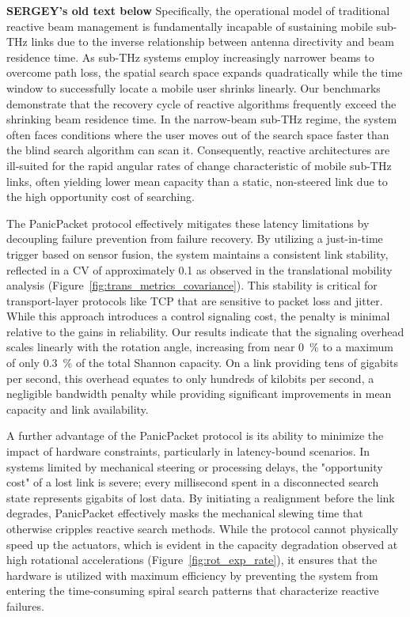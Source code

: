 \documentclass[fleqn,10pt]{wlscirep}
\begin{document}

\textbf{{SERGEY's old text below}}
Specifically, the operational model of traditional reactive beam management is fundamentally incapable of sustaining mobile sub-THz links due to the inverse relationship between antenna directivity and beam residence time. As sub-THz systems employ increasingly narrower beams to overcome path loss, the spatial search space expands quadratically while the time window to successfully locate a mobile user shrinks linearly. Our benchmarks demonstrate that the recovery cycle of reactive algorithms frequently exceed the shrinking beam residence time. In the narrow-beam sub-THz regime, the system often faces conditions where the user moves out of the search space faster than the blind search algorithm can scan it. Consequently, reactive architectures are ill-suited for the rapid angular rates of change characteristic of mobile sub-THz links, often yielding lower mean capacity than a static, non-steered link due to the high opportunity cost of searching.

The PanicPacket protocol effectively mitigates these latency limitations by decoupling failure prevention from failure recovery. By utilizing a just-in-time trigger based on sensor fusion, the system maintains a consistent link stability, reflected in a CV of approximately 0.1 as observed in the translational mobility analysis (Figure~\ref{fig:trans_metrics_covariance}). This stability is critical for transport-layer protocols like TCP that are sensitive to packet loss and jitter. While this approach introduces a control signaling cost, the penalty is minimal relative to the gains in reliability. Our results indicate that the signaling overhead scales linearly with the rotation angle, increasing from near \SI{0}{\percent} to a maximum of only \SI{0.3}{\percent} of the total Shannon capacity. On a link providing tens of gigabits per second, this overhead equates to only hundreds of kilobits per second, a negligible bandwidth penalty while providing significant improvements in mean capacity and link availability.

A further advantage of the PanicPacket protocol is its ability to minimize the impact of hardware constraints, particularly in latency-bound scenarios. In systems limited by mechanical steering or processing delays, the "opportunity cost" of a lost link is severe; every millisecond spent in a disconnected search state represents gigabits of lost data. By initiating a realignment before the link degrades, PanicPacket effectively masks the mechanical slewing time that otherwise cripples reactive search methods. While the protocol cannot physically speed up the actuators, which is evident in the capacity degradation observed at high rotational accelerations (Figure~\ref{fig:rot_exp_rate}), it ensures that the hardware is utilized with maximum efficiency by preventing the system from entering the time-consuming spiral search patterns that characterize reactive failures.
\end{document}
